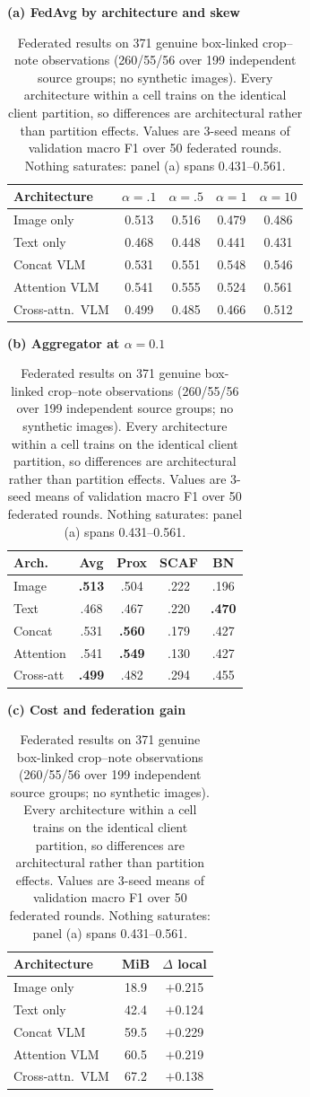 
\begin{table}[t]
\caption{Federated results on 371 genuine box-linked crop--note observations (260/55/56 over 199 independent source groups; no synthetic images). Every architecture within a cell trains on the identical client partition, so differences are architectural rather than partition effects. Values are 3-seed means of validation macro F1 over 50 federated rounds. Nothing saturates: panel (a) spans 0.431--0.561.}
\label{tab:standard_suite}
\centering\scriptsize
\setlength\tabcolsep{2.7pt}
\begin{minipage}[t]{0.38\textwidth}
\centering
\textbf{(a) FedAvg by architecture and skew}
\begin{tabular}{lcccc}
\toprule
Architecture & $\alpha{=}.1$ & $\alpha{=}.5$ & $\alpha{=}1$ & $\alpha{=}10$\\
\midrule
Image only        & 0.513 & 0.516 & 0.479 & 0.486\\
Text only         & 0.468 & 0.448 & 0.441 & 0.431\\
Concat VLM        & 0.531 & 0.551 & 0.548 & 0.546\\
Attention VLM     & 0.541 & 0.555 & 0.524 & 0.561\\
Cross-attn.\ VLM  & 0.499 & 0.485 & 0.466 & 0.512\\
\bottomrule
\end{tabular}
\end{minipage}\hfill
\begin{minipage}[t]{0.30\textwidth}
\centering
\textbf{(b) Aggregator at $\alpha{=}0.1$}
\begin{tabular}{lcccc}
\toprule
Arch. & Avg & Prox & SCAF & BN\\
\midrule
Image      & \textbf{.513} & .504 & .222 & .196\\
Text       & .468 & .467 & .220 & \textbf{.470}\\
Concat     & .531 & \textbf{.560} & .179 & .427\\
Attention  & .541 & \textbf{.549} & .130 & .427\\
Cross-att  & \textbf{.499} & .482 & .294 & .455\\
\bottomrule
\end{tabular}
\end{minipage}\hfill
\begin{minipage}[t]{0.28\textwidth}
\centering
\textbf{(c) Cost and federation gain}
\begin{tabular}{lcc}
\toprule
Architecture & MiB & $\Delta$ local\\
\midrule
Image only        & 18.9 & $+$0.215\\
Text only         & 42.4 & $+$0.124\\
Concat VLM        & 59.5 & $+$0.229\\
Attention VLM     & 60.5 & $+$0.219\\
Cross-attn.\ VLM  & 67.2 & $+$0.138\\
\bottomrule
\end{tabular}
\end{minipage}
\end{table}
